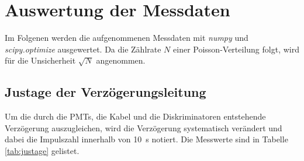 \section{Auswertung der Messdaten}
\label{sec:Auswertung}
Im Folgenen werden die aufgenommenen Messdaten mit \textit{numpy} und \textit{scipy.optimize} ausgewertet. Da die Zählrate $N$ einer Poisson-Verteilung folgt, wird
für die Unsicherheit $\sqrt{N}$ angenommen. 

\subsection{Justage der Verzögerungsleitung}
\label{sec:justage}
Um die durch die PMTs, die Kabel und die Diskriminatoren entstehende Verzögerung auszugleichen, wird die Verzögerung systematisch verändert und dabei die Impulszahl innerhalb von \SI{10}{\second} 
notiert. Die Messwerte sind in Tabelle \ref{tab:justage} gelistet. 

